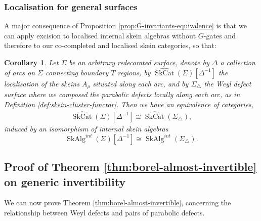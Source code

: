 \documentclass[a4paper]{article}
\numberwithin{equation}{section}
\newtheorem{corollary}[counter]{Corollary}
\newcommand{\1}{{\mathrm{1}\mkern-4mu{\mathchoice{}{}{\mskip-0.5mu}{\mskip-1mu}}\mathrm{l}}}
\DeclareMathOperator{\SkCat}{SkCat}
\DeclareMathOperator{\SkAlg}{SkAlg}
\begin{document}
\subsubsection{Localisation for general surfaces}
A major consequence of Proposition \ref{prop:G-invariants-equivalence} is that we can apply excision to localised internal skein algebras without $G$-gates and therefore to our co-completed and localised skein categories, so that:

\begin{corollary}\label{cor:general-surfaces-invertibility}
  Let $\Sigma$ be an arbitrary redecorated surface, denote by $\Delta$ a collection of arcs on $\Sigma$ connecting boundary $T$ regions, by  $\widehat{\SkCat}(\Sigma)[\Delta^{-1}]$ the localisation of the skeins $A_\rho$ situated along each arc, and by $\Sigma_\triangle$ the Weyl defect surface where we composed the parabolic defects locally along each arc, as in Definition \ref{def:skein-cluster-functor}. 
  Then we have an equivalence of categories,
\begin{align}
         \widehat{\SkCat}(\Sigma)[\Delta^{-1}] \cong \widehat{\SkCat}( \Sigma_\triangle ),
     \end{align}
    induced by an isomorphism of internal skein algebras
    \begin{equation}
      \SkAlg^{int}(\Sigma)[\Delta^{-1}] \cong \SkAlg^{int}(\Sigma_\triangle).
    \end{equation}
\end{corollary}

\subsection{Proof of Theorem \ref{thm:borel-almost-invertible} on generic invertibility}\label{sec:proof-of-generic-invertibility}
We can now prove Theorem \ref{thm:borel-almost-invertible}, concerning the relationship between Weyl defects and pairs of parabolic defects.
\end{document}
